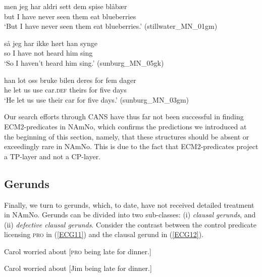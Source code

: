 \documentclass[output=paper,colorlinks,citecolor=brown]{langscibook}
\begin{document}
\begin{exe} 

\item \label{ECMamno}

\begin{xlist}


\item \label{ECMamno1} \gll men jeg har aldri sett dem spise blåbær \\
        but I have never seen them eat blueberries \\
         \glt `But I have never seen them eat blueberries.' \hfill(stillwater\_MN\_01gm)

\item \label{ECMamno2} \gll så jeg har ikke hørt han synge \\
        so I have not heard him sing \\
         \glt `So I haven't heard him sing.' \hfill(sunburg\_MN\_05gk)

\item \label{ECMamno3} \gll han lot oss bruke bilen deres for fem dager \\
        he let us use car.\textsc{def} theirs for five days \\
         \glt `He let us use their car for five days.' \hfill(sunburg\_MN\_03gm)

         
\end{xlist}
\end{exe}

Our search efforts through CANS have thus far not been successful in finding ECM2-predicates in NAmNo, which confirms the predictions we introduced at the beginning of this section, namely, that these structures should be absent or exceedingly rare in NAmNo. This is due to the fact that ECM2-predicates project a TP-layer and not a CP-layer. 


\subsection{Gerunds} \label{gerundives}

Finally, we turn to gerunds, which, to date, have not received detailed treatment in NAmNo. Gerunds can be divided into two sub-classes: (i) \textit{clausal gerunds}, and (ii) \textit{defective clausal gerunds}. Consider the contrast between the control predicate licensing \textsc{pro} in (\ref{ECG11}) and the clausal gerund in (\ref{ECG12}).

\begin{exe}

\item \label{ECG1}

\begin{xlist}

\item Carol worried about [\textsc{pro} being late for dinner.] \label{ECG11}

\item Carol worried about [Jim being late for dinner.] \label{ECG12}

\end{xlist}

\end{exe}
\end{document}
